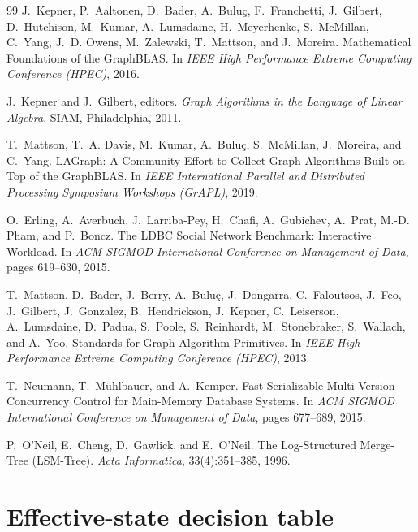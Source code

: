 \documentclass[11pt,a4paper]{article}
\theoremstyle{plain}
\theoremstyle{definition}
\theoremstyle{remark}
\begin{document}
\begin{thebibliography}{99}
J.~Kepner, P.~Aaltonen, D.~Bader, A.~Buluç, F.~Franchetti, J.~Gilbert,
D.~Hutchison, M.~Kumar, A.~Lumsdaine, H.~Meyerhenke, S.~McMillan, C.~Yang,
J.~D. Owens, M.~Zalewski, T.~Mattson, and J.~Moreira.
\newblock Mathematical Foundations of the GraphBLAS.
\newblock In \emph{IEEE High Performance Extreme Computing Conference (HPEC)},
2016.

J.~Kepner and J.~Gilbert, editors.
\newblock \emph{Graph Algorithms in the Language of Linear Algebra}.
\newblock SIAM, Philadelphia, 2011.

T.~Mattson, T.~A. Davis, M.~Kumar, A.~Buluç, S.~McMillan, J.~Moreira, and
C.~Yang.
\newblock LAGraph: A Community Effort to Collect Graph Algorithms Built on Top
of the GraphBLAS.
\newblock In \emph{IEEE International Parallel and Distributed Processing
Symposium Workshops (GrAPL)}, 2019.

O.~Erling, A.~Averbuch, J.~Larriba-Pey, H.~Chafi, A.~Gubichev, A.~Prat,
M.-D. Pham, and P.~Boncz.
\newblock The LDBC Social Network Benchmark: Interactive Workload.
\newblock In \emph{ACM SIGMOD International Conference on Management of Data},
pages 619--630, 2015.

T.~Mattson, D.~Bader, J.~Berry, A.~Buluç, J.~Dongarra, C.~Faloutsos,
J.~Feo, J.~Gilbert, J.~Gonzalez, B.~Hendrickson, J.~Kepner, C.~Leiserson,
A.~Lumsdaine, D.~Padua, S.~Poole, S.~Reinhardt, M.~Stonebraker, S.~Wallach,
and A.~Yoo.
\newblock Standards for Graph Algorithm Primitives.
\newblock In \emph{IEEE High Performance Extreme Computing Conference (HPEC)},
2013.

T.~Neumann, T.~Mühlbauer, and A.~Kemper.
\newblock Fast Serializable Multi-Version Concurrency Control for Main-Memory
Database Systems.
\newblock In \emph{ACM SIGMOD International Conference on Management of Data},
pages 677--689, 2015.

P.~O'Neil, E.~Cheng, D.~Gawlick, and E.~O'Neil.
\newblock The Log-Structured Merge-Tree (LSM-Tree).
\newblock \emph{Acta Informatica}, 33(4):351--385, 1996.

\end{thebibliography}

\appendix

\section{Effective-state decision table}
\label{app:table}
\end{document}
